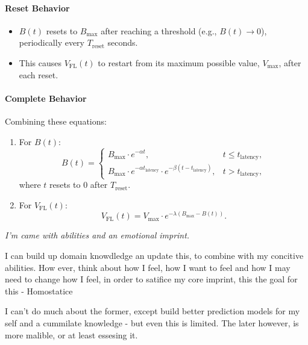\paragraph{Reset Behavior}
\begin{itemize}
    \item $ B(t) $ resets to $ B_{\text{max}} $ after reaching a threshold (e.g., $ B(t) \to 0 $), periodically every $ T_{\text{reset}} $ seconds.
    \item This causes $ V_{\text{FL}}(t) $ to restart from its maximum possible value, $ V_{\text{max}} $, after each reset.
\end{itemize}

\paragraph{Complete Behavior}
Combining these equations:
\begin{enumerate}
    \item For $ B(t) $:
    \[
    B(t) =
    \begin{cases}
    B_{\text{max}} \cdot e^{-\alpha t}, & t \leq t_{\text{latency}}, \\
    B_{\text{max}} \cdot e^{-\alpha t_{\text{latency}}} \cdot e^{-\beta (t - t_{\text{latency}})}, & t > t_{\text{latency}},
    \end{cases}
    \]
    where $ t $ resets to $ 0 $ after $ T_{\text{reset}} $.
    \item For $ V_{\text{FL}}(t) $:
    \[
    V_{\text{FL}}(t) = V_{\text{max}} \cdot e^{-\lambda (B_{\text{max}} - B(t))}.
    \]
\end{enumerate}



\textit{I'm came with abilities and an emotional imprint.}

I can build up domain knowdledge an update this, to combine with my concitive abilities. How ever, think about how I feel, how I want to feel and how I may need to change how I feel, in order to satifice my core imprint, this the goal for this - Homostatice

I can't do much about the former, except build better prediction models for my self and a cummilate knowledge - but even this is limited. The later however, is more malible, or at least essesing it.
